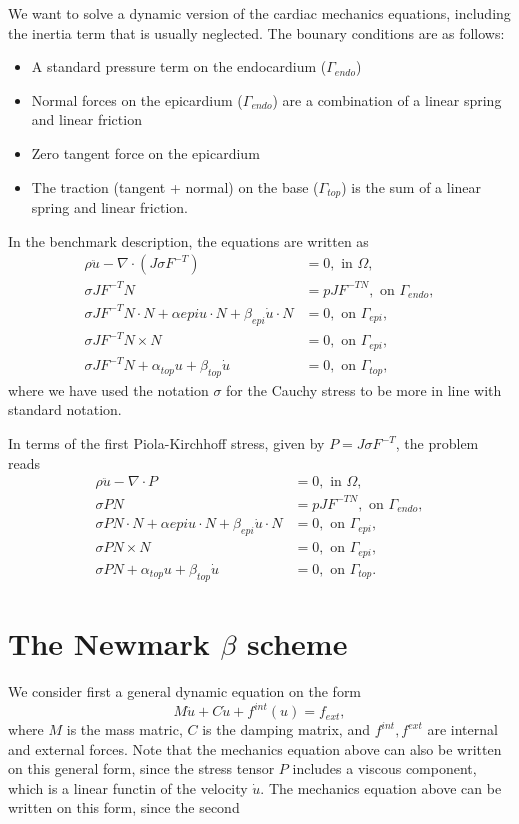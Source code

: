\documentclass[a4paper,10pt]{article}
\begin{document}
We want to solve a dynamic version of the cardiac mechanics equations, including the
inertia term that is usually neglected. The bounary conditions are as follows:
\begin{itemize}
\item A standard pressure term on the endocardium ($\Gamma_{endo}$)
\item Normal forces on the epicardium ($\Gamma_{endo}$) are a combination of a linear spring
and linear friction
\item Zero tangent force on the epicardium
\item The traction (tangent + normal) on the base ($\Gamma_{top}$) is the sum of
a linear spring and linear friction.
\end{itemize}
In the benchmark description, the equations are written as
\begin{align*}
  \rho \ddot{u} - \nabla\cdot(J\sigma F^{-T}) &= 0, \mbox{ in } \Omega ,\\
  \sigma J F^{-T}N &= pJF^{-TN}, \mbox{ on } \Gamma_{endo}, \\
  \sigma JF^{-T}N\cdot N + \alpha{epi}u\cdot N + \beta_{epi}\dot{u}\cdot N &= 0, \mbox{ on }  \Gamma_{epi}, \\
  \sigma JF^{-T}N\times N &=0, \mbox{ on }  \Gamma_{epi}, \\
  \sigma JF^{-T}N + \alpha_{top}u + \beta_{top}\dot{u} &= 0, \mbox{ on } \Gamma_{top},
\end{align*}
where we have used the notation $\sigma$ for the Cauchy stress to be more in line with standard notation.

In terms of the first Piola-Kirchhoff stress, given by $P = J\sigma F^{-T}$, the problem reads
\begin{align*}
  \rho \ddot{u} - \nabla\cdot P &= 0, \mbox{ in } \Omega ,\\
  \sigma PN &= pJF^{-TN}, \mbox{ on } \Gamma_{endo}, \\
  \sigma PN\cdot N + \alpha{epi}u\cdot N + \beta_{epi}\dot{u}\cdot N &= 0, \mbox{ on }  \Gamma_{epi}, \\
  \sigma PN\times N &=0, \mbox{ on }  \Gamma_{epi}, \\
  \sigma PN + \alpha_{top}u + \beta_{top}\dot{u} &= 0, \mbox{ on } \Gamma_{top}.
\end{align*}

\section{The Newmark $\beta$ scheme}
We consider first a general dynamic equation on the form
\[
M\ddot{u} + C\dot{u} + f^{int}(u) = f_{ext},
\]
where $M$ is the mass matric, $C$ is the damping matrix, and $f^{int}, f^{ext}$
are internal and external forces. Note that the mechanics equation above can also
be written on this general form, since the stress tensor $P$ includes a viscous
component, which is a linear functin of the velocity $\dot{u}$.
The mechanics equation above can be written on this form, since the second
\end{document}
